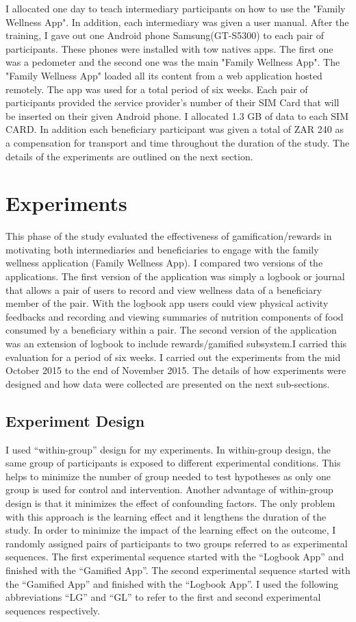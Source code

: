 I allocated one day to teach intermediary participants on how to use the "Family Wellness App". In addition, each intermediary was given a user manual. After the training, I gave out one Android phone Samsung(GT-S5300) to each pair of participants. These phones were installed with tow natives apps. The first one was a pedometer and the second one was the main "Family Wellness App". The "Family Wellness App" loaded all its content from a web application hosted remotely. The app was used for a total period of six weeks. Each pair of participants provided the service provider's number of their SIM Card that will be inserted on their given Android phone. I allocated 1.3 GB of data to each SIM CARD. In addition each beneficiary participant was given a total of ZAR 240 as a compensation for transport and time throughout the duration of the study. The details of the experiments are outlined on the next section.

\section{Experiments}
This phase of the study evaluated the effectiveness of gamification/rewards in motivating both intermediaries and beneficiaries to engage with the family wellness application (Family Wellness App). I compared two versions of the applications. The first version of the application was simply a logbook or journal that allows a pair of users to record and view wellness data of a beneficiary member of the pair. With the logbook app users could view physical activity feedbacks and recording and viewing summaries of nutrition components of food consumed by a beneficiary within a pair. The second version of the application was an extension of logbook to include rewards/gamified subsystem.I carried this evaluation for a period of six weeks. I carried out the experiments from the mid October 2015 to the end of November 2015.  The details of how experiments were designed and how data were collected are presented on the next sub-sections.
\subsection{Experiment Design}
I used ``within-group'' design for my experiments. In within-group design, the same group of participants is exposed to different experimental conditions. This helps to minimize the number of group needed to test hypotheses as only one group is used for control and intervention. Another advantage of within-group design is that it minimizes the effect of confounding factors. The only problem with this approach is the learning effect and it lengthens the duration of the study. In order to minimize the impact of the learning effect on the outcome, I randomly assigned pairs of participants to two groups referred to as experimental sequences. The first experimental sequence started with the ``Logbook App''  and finished with the ``Gamified App''. The second experimental sequence started with the ``Gamified App'' and finished with the ``Logbook App''. I used the following abbreviations ``LG'' and ``GL'' to refer to the first and second experimental sequences respectively.

